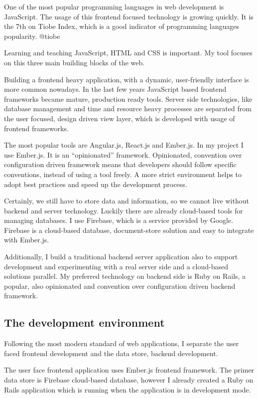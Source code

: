 One of the most popular programming languages in web development is
JavaScript. The usage of this frontend focused technology is growing
quickly. It is the 7th on Tiobe Index, which is a good indicator of
programming languages popularity. @tiobe

Learning and teaching JavaScript, HTML and CSS is important. My tool
focuses on this three main building blocks of the web.

Building a frontend heavy application, with a dynamic, user-friendly
interface is more common nowadays. In the last few years JavaScript
based frontend frameworks became mature, production ready tools. Server
side technologies, like database management and time and resource heavy
processes are separated from the user focused, design driven view layer,
which is developed with usage of frontend frameworks.

The most popular tools are Angular.js, React.js and Ember.js. In my
project I use Ember.js. It is an ``opinionated'' framework. Opinionated,
convention over configuration driven framework means that developers
should follow specific conventions, instead of using a tool freely. A
more strict environment helps to adopt best practices and speed up the
development process.

Certainly, we still have to store data and information, so we cannot
live without backend and server technology. Luckily there are already
cloud-based tools for managing databases. I use Firebase, which is a
service provided by Google. Firebase is a cloud-based database,
document-store solution and easy to integrate with Ember.js.

Additionally, I build a traditional backend server application also to
support development and experimenting with a real server side and a
cloud-based solutions parallel. My preferred technology on backend side
is Ruby on Rails, a popular, also opinionated and convention over
configuration driven backend framework.

\subsection{The development
environment}\label{the-development-environment}

Following the most modern standard of web applications, I separate the
user faced frontend development and the data store, backend development.

The user face frontend application uses Ember.js frontend framework. The
primer data store is Firebase cloud-based database, however I already
created a Ruby on Rails application which is running when the
application is in development mode.

